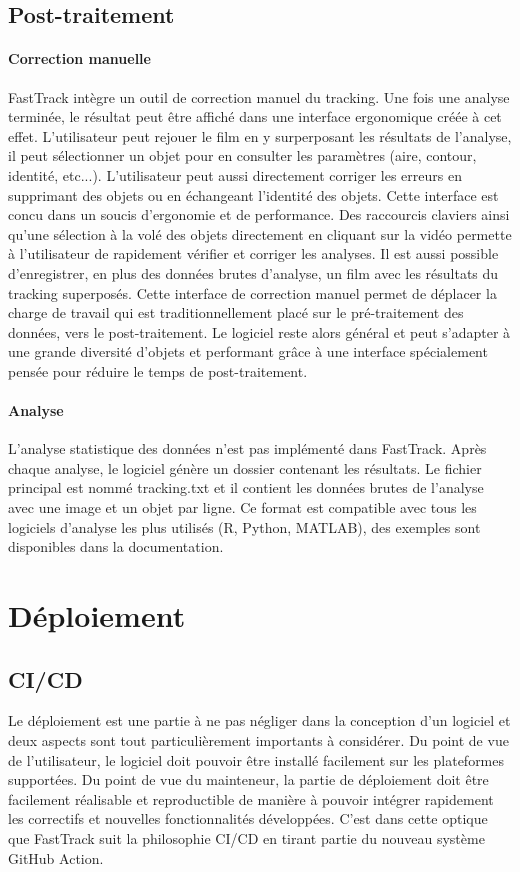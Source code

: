 		\subsection{Post-traitement}
		
		\paragraph{Correction manuelle}
		FastTrack intègre un outil de correction manuel du tracking. Une fois une analyse terminée, le résultat peut être affiché dans une interface ergonomique créée à cet effet. L'utilisateur peut rejouer le film en y surperposant les résultats de l'analyse, il peut sélectionner un objet pour en consulter les paramètres (aire, contour, identité, etc...). L'utilisateur peut aussi directement corriger les erreurs en supprimant des objets ou en échangeant l'identité des objets. Cette interface est concu dans un soucis d'ergonomie et de performance. Des raccourcis claviers ainsi qu'une sélection à la volé des objets directement en cliquant sur la vidéo permette à l'utilisateur de rapidement vérifier et corriger les analyses. Il est aussi possible d'enregistrer, en plus des données brutes d'analyse, un film avec les résultats du tracking superposés.
		Cette interface de correction manuel permet de déplacer la charge de travail qui est traditionnellement placé sur le pré-traitement des données, vers le post-traitement. Le logiciel reste alors général et peut s'adapter à une grande diversité d'objets et performant grâce à une interface spécialement pensée pour réduire le temps de post-traitement.
		
		\paragraph{Analyse}
		L'analyse statistique des données n'est pas implémenté dans FastTrack. Après chaque analyse, le logiciel génère un dossier contenant les résultats. Le fichier principal est nommé tracking.txt et il contient les données brutes de l'analyse avec une image et un objet par ligne. Ce format est compatible avec tous les logiciels d'analyse les plus utilisés (R, Python, MATLAB), des exemples sont disponibles dans la documentation.
		
	\section{Déploiement}
		\subsection{CI/CD}
		Le déploiement est une partie à ne pas négliger dans la conception d'un logiciel et deux aspects sont tout particulièrement importants à considérer. Du point de vue de l'utilisateur, le logiciel doit pouvoir être installé facilement sur les plateformes supportées. Du point de vue du mainteneur, la partie de déploiement doit être facilement réalisable et reproductible de manière à pouvoir intégrer rapidement les correctifs et nouvelles fonctionnalités développées. C'est dans cette optique que FastTrack suit la philosophie CI/CD en tirant partie du nouveau système GitHub Action.\\
		
